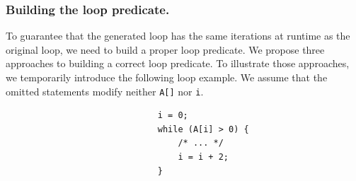 \subsubsection{Building the loop predicate.}

To guarantee that the generated loop has the same iterations at runtime as the original loop, we need to build a proper loop predicate. 
We propose three approaches to building a correct loop predicate. 
To illustrate those approaches, we temporarily introduce the following loop example. We assume that the omitted statements  modify neither \texttt{A[]} nor \texttt{i}.
\small
\begin{verbatim}
                              i = 0;
                              while (A[i] > 0) {
                                  /* ... */
                                  i = i + 2;
                              }
\end{verbatim}
\normalsize



